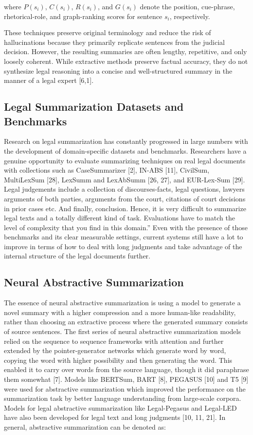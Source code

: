 \documentclass[11pt, a4paper]{article}
\theoremstyle{plain}%
\theoremstyle{remark}%
\theoremstyle{definition}%
\begin{document}
where \(P(s_i)\), \(C(s_i)\), \(R(s_i)\), and \(G(s_i)\) denote the position, cue-phrase, rhetorical-role, and graph-ranking scores for sentence \(s_i\), respectively.

These techniques preserve original terminology and reduce the risk of hallucinations because they primarily replicate sentences from the judicial decision. However, the resulting summaries are often lengthy, repetitive, and only loosely coherent. While extractive methods preserve factual accuracy, they do not synthesize legal reasoning into a concise and well-structured summary in the manner of a legal expert [6,1].


\subsection{Legal Summarization Datasets and Benchmarks}

Research on legal summarization has constantly progressed in large numbers with the development of domain-specific datasets and benchmarks. Researchers have a genuine opportunity to evaluate summarizing techniques on real legal documents with collections such as CaseSummarizer [2], IN-ABS [11], CivilSum, MultiLexSum [28], LexSumm and LexAbSumm [26, 27], and EUR-Lex-Sum [29]. Legal judgements include a collection of discourses-facts, legal questions, lawyers arguments of both parties, arguments from the court, citations of court decisions in prior cases etc. And finally, conclusion. Hence, it is very difficult to summarize legal texts and a totally different kind of task. Evaluations have to match the level of complexity that you find in this domain.” Even with the presence of those benchmarks and its clear measurable settings, current systems still have a lot to improve in terms of how to deal with long judgments and take advantage of the internal structure of the legal documents further.

\subsection{Neural Abstractive Summarization}
The essence of neural abstractive summarization is using a model to generate a novel summary with a higher compression and a more human-like readability, rather than choosing an extractive process where the generated summary consists of source sentences. The first series of neural abstractive summarization models relied on the sequence to sequence frameworks with attention and further extended by the pointer-generator networks which generate word by word, copying the word with higher possibility and then generating the word. This enabled it to carry over words from the source language, though it did paraphrase them somewhat [7]. Models like BERTSum, BART [8], PEGASUS [10] and T5 [9] were used for abstractive summarization which improved the performance on the summarization task by better language understanding from large-scale corpora. Models for legal abstractive summarization like Legal-Pegasus and Legal-LED have also been developed for legal text and long judgments [10, 11, 21]. In general, abstractive summarization can be denoted as:
\end{document}
